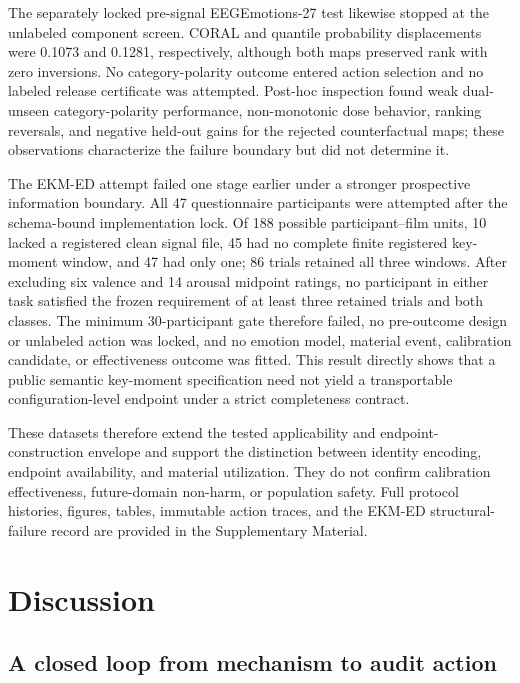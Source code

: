 \documentclass[preprint,12pt]{elsarticle}
\begin{document}
The separately locked pre-signal EEGEmotions-27 test likewise stopped at the unlabeled component screen. CORAL and quantile probability displacements were 0.1073 and 0.1281, respectively, although both maps preserved rank with zero inversions. No category-polarity outcome entered action selection and no labeled release certificate was attempted. Post-hoc inspection found weak dual-unseen category-polarity performance, non-monotonic dose behavior, ranking reversals, and negative held-out gains for the rejected counterfactual maps; these observations characterize the failure boundary but did not determine it.

The EKM-ED attempt failed one stage earlier under a stronger prospective information boundary. All 47 questionnaire participants were attempted after the schema-bound implementation lock. Of 188 possible participant--film units, 10 lacked a registered clean signal file, 45 had no complete finite registered key-moment window, and 47 had only one; 86 trials retained all three windows. After excluding six valence and 14 arousal midpoint ratings, no participant in either task satisfied the frozen requirement of at least three retained trials and both classes. The minimum 30-participant gate therefore failed, no pre-outcome design or unlabeled action was locked, and no emotion model, material event, calibration candidate, or effectiveness outcome was fitted. This result directly shows that a public semantic key-moment specification need not yield a transportable configuration-level endpoint under a strict completeness contract.

These datasets therefore extend the tested applicability and endpoint-construction envelope and support the distinction between identity encoding, endpoint availability, and material utilization. They do not confirm calibration effectiveness, future-domain non-harm, or population safety. Full protocol histories, figures, tables, immutable action traces, and the EKM-ED structural-failure record are provided in the Supplementary Material.

\section{Discussion}
\label{sec:discussion}

\subsection{A closed loop from mechanism to audit action}
\end{document}
